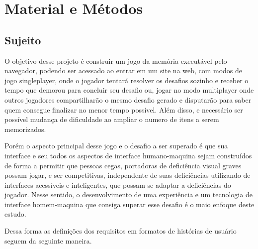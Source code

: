 \chapter{Material e Métodos}

\label{chap:Material e Métodos}

\section{Sujeito}
O objetivo desse projeto é construir um jogo da memória executável pelo navegador, podendo ser acessado ao entrar em um site na web, com modos de jogo singleplayer, onde o jogador tentará resolver os desafios sozinho e receber o tempo que demorou para concluir seu desafio ou, jogar no modo multiplayer onde outros jogadores compartilharão o mesmo desafio gerado e disputarão para saber quem consegue finalizar no menor tempo possível. Além disso, e necessário ser possível mudança de dificuldade ao ampliar o numero de itens a serem memorizados.

Porém o aspecto principal desse jogo e o desafio a ser superado é que sua interface e seu todos os aspectos de interface humano-maquina sejam construídos de forma a permitir que pessoas cegas, portadoras de deficiência visual graves possam jogar, e ser competitivas, independente de suas deficiências utilizando de interfaces acessíveis e inteligentes, que possam se adaptar a deficiências do jogador. Nesse sentido, o desenvolvimento de uma experiência e um tecnologia de interface homem-maquina que consiga superar esse desafio é o maio enfoque deste estudo.

Dessa forma as definições dos requisitos em formatos de histórias de usuário seguem da seguinte maneira.

